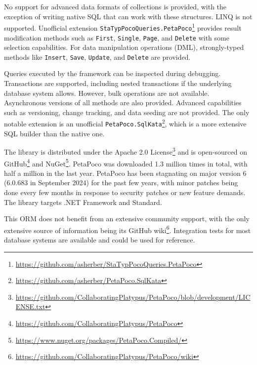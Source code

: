 No support for advanced data formats of collections is provided, with the exception of writing native SQL that can work with these structures. LINQ is not supported. Unofficial extension \texttt{StaTypPocoQueries.PetaPoco}\footnote{\url{https://github.com/asherber/StaTypPocoQueries.PetaPoco}} provides result modification methods such as \texttt{First}, \texttt{Single}, \texttt{Page}, and \texttt{Delete} with some selection capabilities. For data manipulation operations (DML), strongly-typed methods like \texttt{Insert}, \texttt{Save}, \texttt{Update}, and \texttt{Delete} are provided. 

Queries executed by the framework can be inspected during debugging. Transactions are supported, including nested transactions if the underlying database system allows. However, bulk operations are not available. Asynchronous versions of all methods are also provided. Advanced capabilities such as versioning, change tracking, and data seeding are not provided. The only notable extension is an unofficial \texttt{PetaPoco.SqlKata}\footnote{\url{https://github.com/asherber/PetaPoco.SqlKata}}, which is a more extensive SQL builder than the native one.

The library is distributed under the Apache 2.0 License\footnote{\url{https://github.com/CollaboratingPlatypus/PetaPoco/blob/development/LICENSE.txt}} and is open-sourced on GitHub\footnote{\url{https://github.com/CollaboratingPlatypus/PetaPoco}} and NuGet\footnote{\url{https://www.nuget.org/packages/PetaPoco.Compiled/}}. PetaPoco was downloaded 1.3 million times in total, with half a million in the last year. PetaPoco has been stagnating on major version 6 (6.0.683 in September 2024) for the past few years, with minor patches being done every few months in response to security patches or new feature demands. The library targets .NET Framework and Standard.

This ORM does not benefit from an extensive community support, with the only extensive source of information being its GitHub wiki\footnote{\url{https://github.com/CollaboratingPlatypus/PetaPoco/wiki}}. Integration tests for most database systems are available and could be used for reference.


